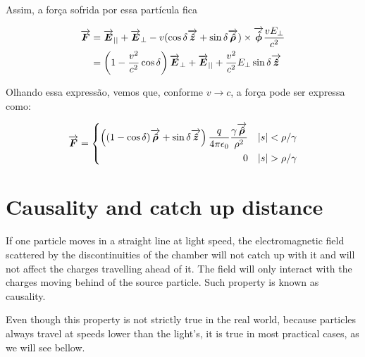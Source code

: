 \begin{apendicesenv}
    Assim, a força sofrida por essa partícula fica

    \begin{equation}\begin{aligned}
    	\overrightarrow{\boldsymbol{F}} &= \overrightarrow{\boldsymbol{E}}_{||} + \overrightarrow{\boldsymbol{E}}_\perp - v(\cos\delta \overrightarrow{\boldsymbol{\hat{z}}} + \sin\delta\overrightarrow{\boldsymbol{\hat{\rho}}}) \times \overrightarrow{\boldsymbol{\hat{\phi}}}\frac{vE_\perp}{c^2} \\
		&= \left(1-\frac{v^2}{c^2}\cos\delta\right)\overrightarrow{\boldsymbol{E}}_\perp + \overrightarrow{\boldsymbol{E}}_{||} + \frac{v^2}{c^2}E_\perp\sin\delta\overrightarrow{\boldsymbol{\hat{z}}}
    \end{aligned}\end{equation}

    Olhando essa expressão, vemos que, conforme $v \to c$, a força pode ser expressa como:

    \begin{equation}
    	\vect{F} = \left\{
    	\begin{aligned}
    		\left((1-\cos\delta)\vect{\hat{\rho}} + \sin\delta\vect{\hat{z}}\right)
    		\frac{q}{4\pi\epsilon_0} \frac{\gamma\vect{\hat{\rho}}}{\rho^2} & &|s|<\rho/\gamma\\
    		0 & &|s|>\rho/\gamma
    	\end{aligned}\right.
    \end{equation}


\chapter{Causality and catch up distance}\label{app:causality}

    If one particle moves in a straight line at light speed, the electromagnetic field scattered by the discontinuities of the chamber will not catch up with it and will not affect the charges travelling ahead of it. The field will only interact with the charges moving behind of the source particle. Such property is known as causality.

    Even though this property is not strictly true in the real world, because particles always travel at speeds lower than the light's, it is true in most practical cases, as we will see bellow.


\end{apendicesenv}
